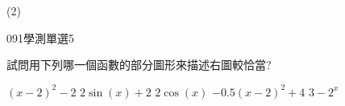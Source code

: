 \begin{QUESTIONS}
\begin{QUESTION}
\begin{QBODY}
            
        \end{QBODY}
        \begin{QFROMS}
        \end{QFROMS}
        \begin{QTAGS}\end{QTAGS}
        \begin{QANS}
            (2)
        \end{QANS}
        \begin{QSOLLIST}
        \end{QSOLLIST}
        \begin{QEMPTYSPACE}
        \end{QEMPTYSPACE}
    \end{QUESTION}
    \begin{QUESTION}
        \begin{ExamInfo}{091}{學測}{單選}{5}
        \end{ExamInfo}
        \begin{ExamAnsRateInfo}{52}{82}{54}{20}
        \end{ExamAnsRateInfo}
        \begin{QBODY}
            試問用下列哪一個函數的部分圖形來描述右圖較恰當?
            \begin{QOPS}
            \QOP $(x-2)^{2}-2$  
            \QOP $2\sin(x)+2$
            \QOP $2\cos(x)$ 
            \QOP $-0.5(x-2)^{2}+4$ 
            \QOP $3-2^{x}$ 
            \end{QOPS}
        \end{QBODY}
        \begin{QFROMS}
        \end{QFROMS}
        \begin{QTAGS}\end{QTAGS}

\end{QUESTION}
\end{QUESTIONS}
